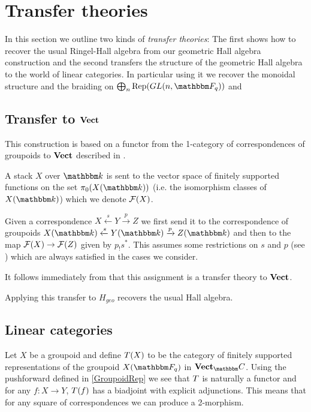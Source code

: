 \section{Transfer theories}
In this section we outline two kinds of \emph{transfer theories}: The first  shows how to recover the usual Ringel-Hall algebra from our geometric Hall algebra construction and the second transfers the structure of the geometric Hall algebra to the world of linear categories. In particular using it we
recover the monoidal structure and the braiding on $\bigoplus_n \Rep(\GL(n,\FF_q))$ and 

\subsection{Transfer to $\mathbf{Vect}$}
\label{VectTransfer}
This construction is based on a functor from the 1-category of correspondences of groupoids to $\mathbf{Vect}$ described in \cite[\S8.2]{KapranovDyckerhoff}. 

A stack $X$ over $\field$ is sent to the vector space of finitely supported functions on the set $\pi_0(X(\field))$ (i.e. the isomorphism classes of $X(\field)$) which we denote $\mathcal{F}(X)$.

Given a correspondence $X \xleftarrow{s} Y \xrightarrow{p} Z$ we first send it to the correspondence of groupoids $X(\field) \xleftarrow{s} Y(\field) \xrightarrow{p} Z(\field)$ and then to the map $\mathcal{F}(X) \to \mathcal{F}(Z)$ given by $p_!s^*$. This assumes some restrictions on $s$ and $p$ (see \cite[\S 2]{Dyckerhoff}) which are always satisfied in the cases we consider. 

It follows immediately from \cite[Proposition 2.17]{Dyckerhoff} that this assignment is a transfer theory to $\mathbf{Vect}$.

Applying this transfer to $H_{geo}$ recovers the usual Hall algebra.
\subsection{Linear categories}
\label{LinCatTransfer}
Let $X$ be a groupoid and define $T(X)$ to be the category of finitely supported representations of the groupoid $X(\FF_q)$ in $\Vect_\CC$. Using the pushforward defined in \autoref{GroupoidRep} we see that $T$ is naturally a functor and for any $f:X\to Y$, $T(f)$ has a biadjoint with explicit adjunctions. This means that for any square of correspondences we can produce a 2-morphism.



